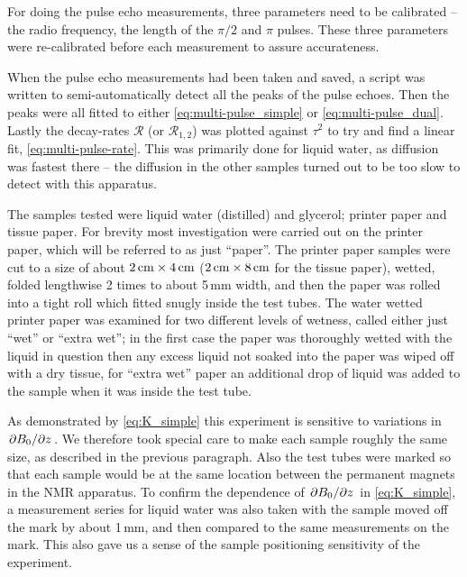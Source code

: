 \documentclass[11pt,a4paper, twocolumn,
swedish, english %
]{article}
\begin{document}
For doing the pulse echo measurements, three parameters need to be
calibrated -- the radio frequency, the length of the $\pi/2$ and $\pi$
pulses. These three parameters were re-calibrated before each
measurement to assure accurateness.

When the pulse echo measurements had been taken and saved, a script
was written to semi-automatically detect all the peaks
of the pulse echoes. Then the peaks were all fitted to either
\eqref{eq:multi-pulse_simple} or \eqref{eq:multi-pulse_dual}.
Lastly the decay-rates $\mathcal{R}$ (or $\mathcal{R}_{1, 2}$) was
plotted against $\tau^2$ to try and find a linear fit,
\eqref{eq:multi-pulse-rate}.\footnotemark{} 
This was primarily done for liquid water, as diffusion was fastest
there -- the diffusion in the other samples turned out to be too slow
to detect with this apparatus. 


The samples tested were liquid water (distilled) and glycerol; 
printer paper and tissue paper. For brevity most investigation were
carried out on the printer paper, which will be referred to as just
``paper''. The printer paper samples were cut to a size of about  
$\unit[2]{cm}\times\unit[4]{cm}$ ($\unit[2]{cm}\times\unit[8]{cm}$ for
the tissue paper), wetted, folded lengthwise 2 times to about 5\,mm
width, and then the paper was rolled into a tight roll which fitted
snugly inside the test tubes.
The water wetted printer paper was examined for two different levels of
wetness, called either just ``wet'' or ``extra wet''; in the first
case the paper was thoroughly wetted with the liquid in question then
any excess liquid not soaked into the paper was wiped off with a dry
tissue, for ``extra wet'' paper an additional drop of liquid was added
to the sample when it was inside the test tube. 


As demonstrated by \eqref{eq:K_simple} this experiment is sensitive to
variations in $\pdv*{B_0}{z}$. We therefore took special care to make
each sample roughly the same size, as described in the previous
paragraph. Also the test tubes were marked so that each sample would 
be at the same location between the permanent magnets in the NMR
apparatus. To confirm the dependence of $\pdv*{B_0}{z}$ in
\eqref{eq:K_simple}, a measurement series for liquid water was also
taken with the sample moved off the mark by about 1\,mm, and then
compared to the same measurements on the mark. This also gave us a
sense of the sample positioning sensitivity of the experiment.
\end{document}
